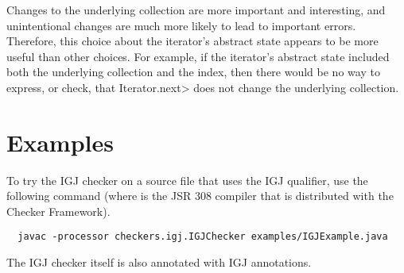 Changes to the underlying collection are more important and interesting,
and unintentional changes are much more likely to lead to important
errors.  Therefore, this choice about the iterator's abstract state
appears to be more useful than other choices.  For example, if the
iterator's abstract state included both the underlying collection and
the index, then there would be no way to express, or check, that
\<Iterator.next> does not change the underlying collection.


\section{Examples\label{igj-example}}

To try the IGJ checker on a source file that uses the IGJ qualifier, use
the following command (where  is the JSR 308 compiler that
is distributed with the Checker Framework).

\begin{Verbatim}
  javac -processor checkers.igj.IGJChecker examples/IGJExample.java
\end{Verbatim}

The IGJ checker itself is also annotated with IGJ annotations.


